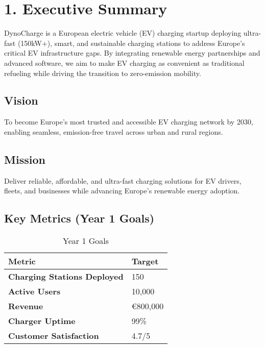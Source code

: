 \section{1. Executive Summary}
DynoCharge is a European electric vehicle (EV) charging startup deploying ultra-fast (150kW+), smart, and sustainable charging stations to address Europe’s critical EV infrastructure gaps. By integrating renewable energy partnerships and advanced software, we aim to make EV charging as convenient as traditional refueling while driving the transition to zero-emission mobility.

\subsection*{Vision}
To become Europe’s most trusted and accessible EV charging network by 2030, enabling seamless, emission-free travel across urban and rural regions.

\subsection*{Mission}
Deliver reliable, affordable, and ultra-fast charging solutions for EV drivers, fleets, and businesses while advancing Europe’s renewable energy adoption.

\subsection*{Key Metrics (Year 1 Goals)}
\begin{table}[h!]
    \centering
    \renewcommand{\arraystretch}{1.5}
    \begin{tabular}{|>{\bfseries}m{}|m{}|}
    \hline
    \textbf{Metric} & \textbf{Target} \\
    \hline
    Charging Stations Deployed & 150 \\
    \hline
    Active Users & 10,000 \\
    \hline
    Revenue & €800,000 \\
    \hline
    Charger Uptime & 99\% \\
    \hline
    Customer Satisfaction & 4.7/5 \\
    \hline
    \end{tabular}
    \caption{Year 1 Goals}
\end{table}
